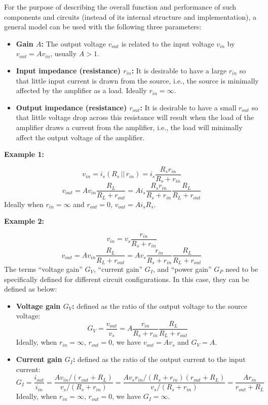 \begin{itemize}
For the purpose of describing the overall function and performance of such 
components and circuits (instead of its internal structure and implementation), 
a general model can be used with the following three parameters:
\begin{itemize}
\item {\bf Gain $A$:} The output voltage $v_{out}$ is related to the input voltage
  $v_{in}$ by $v_{out}=A v_{in}$, usually $A>1$.
\item {\bf Input impedance (resistance) $r_{in}$:} It is desirable to have a
  large $r_{in}$ so that little input current is drawn from the source, i.e., 
  the source is minimally affected by the amplifier as a load. Ideally 
  $r_{in}=\infty$. 
\item {\bf Output impedance (resistance) $r_{out}$:} It is desirable to have
  a small $r_{out}$ so that little voltage drop across this resistance will 
  result when the load of the amplifier draws a current from the amplifier, i.e.,
  the load will minimally affect the output voltage of the amplifier.
\end{itemize}


{\bf Example 1:}


\[ v_{in}=i_s (R_s \,||\, r_{in})=i_s \frac{R_s r_{in}}{R_s+r_{in}} \]
\[ v_{out}=A v_{in} \frac{R_L}{R_L+r_{out}}=
A i_s \frac{R_s r_{in}}{R_s+r_{in}} \frac{R_L}{R_L+r_{out}} \]
Ideally when $r_{in}=\infty$ and $r_{out}=0$, $v_{out}=A i_s R_s$.

{\bf Example 2:}

\[ v_{in}=v_s \frac{r_{in}}{R_s+r_{in}} \]
\[ v_{out}=A v_{in} \frac{R_L}{R_L+r_{out}}
=A v_s \frac{r_{in}}{R_s+r_{in}} \frac{R_L}{R_L+r_{out}} \]
The terms ``voltage gain'' $G_V$, ``current gain'' $G_I$, and ``power gain'' $G_P$
need to be specifically defined for different circuit configurations. In this case,
they can be defined as below:
\begin{itemize}
\item {\bf Voltage gain $G_V$:} defined as the ratio of the output voltage
to the source voltage:
\[ G_V=\frac{v_{out}}{v_s}=A\frac{r_{in}}{R_s+r_{in}} \frac{R_L}{R_L+r_{out}} \]
Ideally, when $r_{in}=\infty$, $r_{out}=0$, we have $v_{out}=A v_s$ and $G_V=A$.

\item {\bf Current gain $G_I$:} defined as the ratio of the output current to
the input current:
\[ G_I=\frac{i_{out}}{i_{in}}=\frac{A v_{in}/(r_{out}+R_L)}{v_s/(R_s+r_{in})}
=\frac{A v_s r_{in}/(R_s+r_{in})(r_{out}+R_L)}{v_s/(R_s+r_{in})}
=\frac{A r_{in}}{r_{out}+R_L} \]
Ideally, when $r_{in}=\infty$, $r_{out}=0$, we have $G_I=\infty$.


\end{itemize}
\end{itemize}
